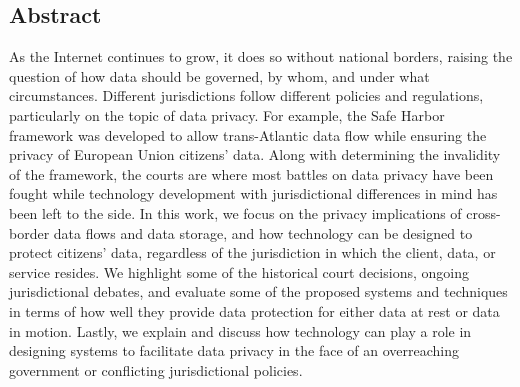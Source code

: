 \subsection*{Abstract}

As the Internet continues to grow, it does so without national borders, 
raising the question of how data should be governed, by whom, and 
under what circumstances.  Different jurisdictions follow different policies 
and regulations, particularly on the topic of data privacy.  For example, the Safe
Harbor framework was developed to allow trans-Atlantic data flow while ensuring 
the privacy of European Union citizens' data.  Along with determining the invalidity 
of the framework, the courts are where most battles on data 
privacy have been fought while technology development with jurisdictional 
differences in mind has been left to the side. In this work, 
we focus on the privacy implications of cross-border data flows and data 
storage, and how technology can be designed to protect citizens' data, regardless 
of the jurisdiction in which the client, data, or service resides.  We highlight 
some of the historical court decisions, ongoing jurisdictional debates, and evaluate 
some of the proposed systems and techniques in terms of how well they provide data protection 
for either data at rest or data in motion.  Lastly, we explain and discuss how 
technology can play a role in designing systems to facilitate data privacy in 
the face of an overreaching government or conflicting jurisdictional policies.
